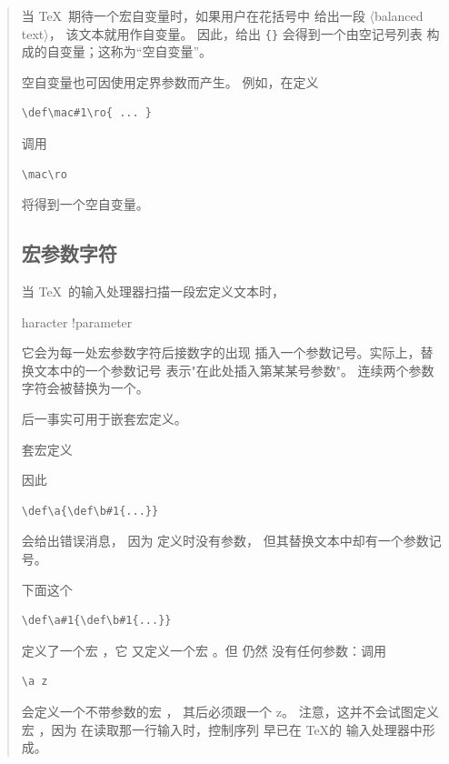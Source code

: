 \documentclass[a4paper]{rapport3}
\def\gr#1{$\langle$#1$\rangle$}\def\key#1{{\tt#1}}
\newenvironment{disp}{\begin{quotation}}{\end{quotation}}
\def\term#1\par{\index{#1}}
\def\howto#1\par{}
\begin{document}
\begin{disp}
当 \TeX\ 期待一个宏自变量时，如果用户在花括号中
给出一段 \gr{balanced text}，
该文本就用作自变量。
因此，给出 \verb-{}- 会得到一个由空记号列表
构成的自变量；这称为“空自变量”。

空自变量也可因使用定界参数而产生。
例如，在定义
\begin{verbatim}
\def\mac#1\ro{ ... }
\end{verbatim}
调用
\begin{verbatim}
\mac\ro
\end{verbatim}
将得到一个空自变量。

\subsection{宏参数字符}

当 \TeX\ 的输入处理器扫描一段宏定义文本时，
\term character !parameter\par
它会为每一处宏参数字符后接数字的出现
插入一个参数记号。实际上，替换文本中的一个参数记号
表示"在此处插入第某某号参数"。
连续两个参数字符会被替换为一个。

后一事实可用于嵌套宏定义。
\label{nest:def}\howto 嵌套宏定义\par
因此 \begin{verbatim}
\def\a{\def\b#1{...}}
\end{verbatim}
会给出错误消息，
因为  定义时没有参数，
但其替换文本中却有一个参数记号。

下面这个
\begin{verbatim}
\def\a#1{\def\b#1{...}}
\end{verbatim}
定义了一个宏 ，它
又定义一个宏 。但  仍然
没有任何参数：调用
\begin{verbatim}
\a z
\end{verbatim}
会定义一个不带参数的宏 ，
其后必须跟一个 \n z。
注意，这并不会试图定义宏 ，因为
在读取那一行输入时，控制序列  早已在 \TeX 的
输入处理器中形成。


\end{disp}
\end{document}
